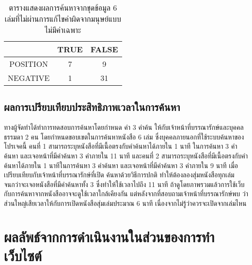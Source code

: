 \begin{table}[H]
    \caption{ตารางแสดงผลการค้นหาจากชุดข้อมูล 6 เล่มที่ไม่ผ่านการแก้ไขคำผิดจากมนุษย์แบบไม่มีคำเฉพาะ}\label{tbl:evasearchnoname2}
    \begin{tabular}{|c|c|c|}
    \hline
                & TRUE & FALSE \\ \hline
    POSITION & 7   & 9   \\ \hline
    NEGATIVE & 1   & 31   \\ \hline
    \end{tabular}
    \end{table}



\subsection{ผลการเปรียบเทียบประสิทธิภาพเวลาในการค้นหา}
ทางผู้จัดทำได้ทำการทดสอบการค้นหาโดยกำหนด คำ 3 คำค้น ให้กับเจ้าหน้าที่บรรณารักษ์และบุคคลธรรมดา 
2 คน โดยกำหนดขอบเขตในการค้นหาหนังสือ 6 เล่ม ซึ่งบุคคลภายนอกที่ใช้ระบบค้นหาของโปรเจคนี้ คนที่ 1 
สามารถระบุหนังสือที่มีเนื้อตรงกับคำค้นหาได้ภายใน 1 นาที ในการค้นหา 3 คำค้นหา และเจอหน้าที่มีคำค้นหา 
3 คำภายใน 11 นาที และคนที่ 2 สามารถระบุหนังสือที่มีเนื้อตรงกับคำค้นหาได้ภายใน 1 นาทีในการค้นหา 3 
คำค้นหา และเจอหน้าที่มีคำค้นหา 3 คำภายใน 9 นาที เมื่อเปรียบเทียบกับเจ้าหน้าที่บรรณารักษ์ที่เปิด
ค้นหาด้วยวิธีการปกติ ทำให้ต้องลองสุ่มหนังสือทุกเล่มจนกว่าจะเจอหนังสือที่มีคำค้นหาทั้ง 3 ซึ่งทำให้ใช้เวลาไปถึง 11 นาที
ถ้าดูโดยภาพรวมแล้วการใช้เว็บกับการค้นหาจากหนังสืออาจจะดูใช้เวลาใกล้เคียงกัน แต่หลังจากที่สอบถามเจ้าหน้าที่บรรณารักษ์พบ
ว่าส่วนใหญ่เสียเวลาให้กับการเปิดหนังสือสุ่มเล่มประมาณ 6 นาที เนื่องจากไม่รู้ว่าควรจะเปิดจากเล่มไหน
 

\section{ผลลัพธ์จากการดำเนินงานในส่วนของการทำเว็บไซต์}
